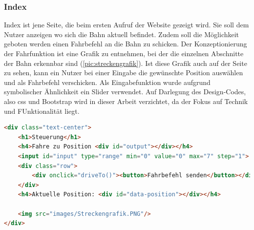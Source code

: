 \subsubsection{Index}
Index ist jene Seite, die beim ersten Aufruf der Website gezeigt wird. Sie soll dem Nutzer anzeigen wo sich die Bahn aktuell befindet. Zudem soll die Möglichkeit geboten werden einen Fahrbefehl an die Bahn zu schicken. Der Konzeptionierung der Fahrfunktion ist eine Grafik zu entnehmen, bei der die einzelnen Abschnitte der Bahn erkennbar sind (\autoref{pic:streckengrafik}). Ist diese Grafik auch auf der Seite zu sehen, kann ein Nutzer bei einer Eingabe die gewünschte Position auswählen und als Fahrbefehl verschicken. Als Eingabefunktion wurde aufgrund symbolischer Ähnlichkeit ein Slider verwendet. Auf Darlegung des Design-Codes, also css und Bootstrap wird in dieser Arbeit verzichtet, da der Fokus auf Technik und FUnktionalität liegt. 
\vspace{1cm}

\begin{lstlisting}[language=html, style=dhpaperdefault]
<div class="text-center">
    <h1>Steuerung</h1>
    <h4>Fahre zu Position <div id="output"></div></h4>
    <input id="input" type="range" min="0" value="0" max="7" step="1">
    <div class="row">
        <div onclick="driveTo()"><button>Fahrbefehl senden</button></div>
    </div>
    <h4>Aktuelle Position: <div id="data-position"></div></h4>

	<img src="images/Streckengrafik.PNG"/>
</div>
\end{lstlisting}
\vspace{1cm}


